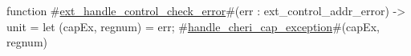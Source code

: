 function #\hyperref[sailRISCVzextzyhandlezycontrolzycheckzyerror]{ext\_handle\_control\_check\_error}#(err : ext_control_addr_error) -> unit = {
  let (capEx, regnum) = err;
  #\hyperref[sailRISCVzhandlezycherizycapzyexception]{handle\_cheri\_cap\_exception}#(capEx, regnum)
}
